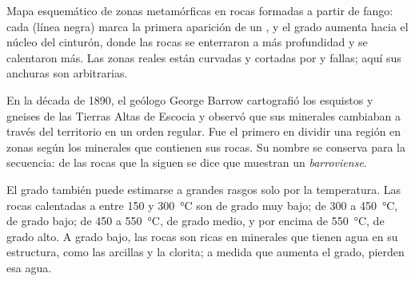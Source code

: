 \begin{omfigure}

{\small Mapa esquemático de zonas metamórficas en rocas formadas a partir de
fango: cada  (línea negra) marca la primera aparición de un , y el grado aumenta hacia el núcleo del cinturón, donde las rocas se
enterraron a más profundidad y se calentaron más. Las zonas reales están
curvadas y cortadas por  y fallas; aquí sus anchuras son arbitrarias.}
\end{omfigure}

\begin{history}
En la década de 1890, el geólogo George Barrow cartografió los esquistos y
gneises de las Tierras Altas de Escocia y observó que sus minerales cambiaban
a través del territorio en un orden regular. Fue el primero en dividir una
región en zonas según los minerales que contienen sus rocas. Su nombre se
conserva para la secuencia: de las rocas que la siguen se dice que muestran un
 \emph{barroviense}.
\end{history}

El grado también puede estimarse a grandes rasgos solo por la temperatura.
Las rocas calentadas a entre 150 y \qty{300}{\celsius} son de grado muy bajo;
de 300 a \qty{450}{\celsius}, de grado bajo; de 450 a \qty{550}{\celsius}, de
grado medio, y por encima de \qty{550}{\celsius}, de grado alto. A grado bajo,
las rocas son ricas en minerales que tienen agua en su estructura, como las
arcillas y la clorita; a medida que aumenta el grado, pierden esa agua.

